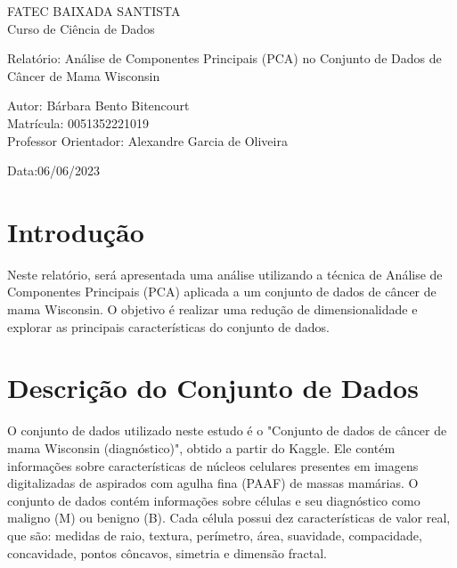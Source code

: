 \documentclass{article}
\begin{document}
\date{} %
\begin{titlepage}
    \begin{center}
        \LARGE FATEC BAIXADA SANTISTA \\ Curso de Ciência de Dados\\
        
        \vspace{8cm}
        
        \LARGE Relatório: Análise de Componentes Principais (PCA) no Conjunto de Dados de Câncer de Mama Wisconsin\\
        
        \vspace{8cm}
        
        \large Autor: Bárbara Bento Bitencourt \\
Matrícula: 0051352221019 \\
Professor Orientador: Alexandre Garcia de Oliveira \\
        
        \vspace{2cm}
        
        \large Data:06/06/2023
    \end{center}
\end{titlepage}
\maketitle


\section{Introdução}

Neste relatório, será apresentada uma análise utilizando a técnica de Análise de Componentes Principais (PCA) aplicada a um conjunto de dados de câncer de mama Wisconsin. O objetivo é realizar uma redução de dimensionalidade e explorar as principais características do conjunto de dados.

\section{Descrição do Conjunto de Dados}

O conjunto de dados utilizado neste estudo é o "Conjunto de dados de câncer de mama Wisconsin (diagnóstico)", obtido a partir do Kaggle. Ele contém informações sobre características de núcleos celulares presentes em imagens digitalizadas de aspirados com agulha fina (PAAF) de massas mamárias. O conjunto de dados contém informações sobre células e seu diagnóstico como maligno (M) ou benigno (B). Cada célula possui dez características de valor real, que são: medidas de raio, textura, perímetro, área, suavidade, compacidade, concavidade, pontos côncavos, simetria e dimensão fractal.
\end{document}
